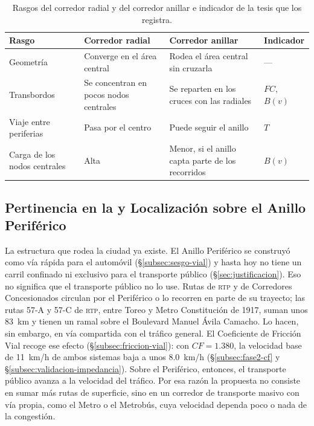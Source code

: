 \begin{table}[H]
    \centering
    \caption[Corredor radial y corredor anillar]{%
    Rasgos del corredor radial y del corredor anillar e indicador de la
    tesis que los registra.}
    \label{tab:radial-anillar}
    \small
    \begin{tabular}{|p{3.2cm}|p{4.2cm}|p{4.2cm}|p{2.4cm}|}
        \hline
        \textbf{Rasgo} & \textbf{Corredor radial} &
        \textbf{Corredor anillar} & \textbf{Indicador} \\
        \hline
        Geometría & Converge en el área central & Rodea el área central
            sin cruzarla & --- \\
        \hline
        Transbordos & Se concentran en pocos nodos centrales & Se reparten
            en los cruces con las radiales & $FC$, $B(v)$ \\
        \hline
        Viaje entre periferias & Pasa por el centro & Puede seguir el anillo &
            $T$ \\
        \hline
        Carga de los nodos centrales & Alta & Menor, si el anillo capta
            parte de los recorridos & $B(v)$ \\
        \hline
    \end{tabular}
\end{table}

\subsection{Pertinencia en la \texorpdfstring{\zmvm{}}{ZMVM} y Localización sobre el Anillo Periférico}
\label{subsec:corredor-anillar-pertinencia}

La estructura que rodea la ciudad ya existe. El Anillo Periférico se construyó
como vía rápida para el automóvil (§\ref{subsec:sesgo-vial}) y hasta hoy no
tiene un carril confinado ni exclusivo para el transporte público
(§\ref{sec:justificacion}). Eso no significa que el transporte público no lo
use. Rutas de \textsc{rtp} y de Corredores Concesionados circulan por el
Periférico o lo recorren en parte de su trayecto; las rutas 57-A y 57-C de
\textsc{rtp}, entre Toreo y Metro Constitución de 1917, suman unos 83~km y
tienen un ramal sobre el Boulevard Manuel Ávila Camacho. Lo hacen, sin embargo,
en vía compartida con el tráfico general. El Coeficiente de Fricción Vial
recoge ese efecto (§\ref{subsec:friccion-vial}): con $CF = 1.380$, la
velocidad base de 11~km/h de ambos sistemas baja a unos 8.0~km/h
(§\ref{subsec:fase2-cf} y §\ref{subsec:validacion-impedancia}). Sobre el
Periférico, entonces, el transporte público avanza a la velocidad del
tráfico. Por esa razón la propuesta no consiste en sumar más rutas de
superficie, sino en un corredor de transporte masivo con vía propia, como el
Metro o el Metrobús, cuya velocidad dependa poco o nada de la congestión.

